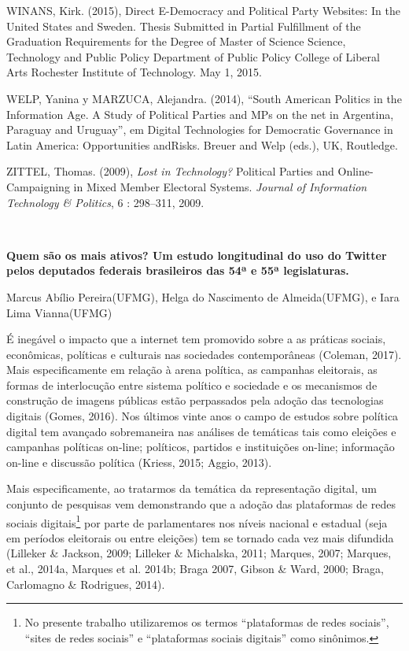 WINANS, Kirk. (2015), Direct E-Democracy and Political Party Websites:
In the United States and Sweden. Thesis Submitted in Partial Fulfillment
of the Graduation Requirements for the Degree of Master of Science
Science, Technology and Public Policy Department of Public Policy
College of Liberal Arts Rochester Institute of Technology. May 1, 2015.

WELP, Yanina y MARZUCA, Alejandra. (2014), ``South American Politics in
the Information Age. A Study of Political Parties and MPs on the net in
Argentina, Paraguay and Uruguay'', em Digital Technologies for
Democratic Governance in Latin America: Opportunities andRisks. Breuer
and Welp (eds.), UK, Routledge.

ZITTEL, Thomas. (2009), \emph{Lost in Technology?} Political Parties and
Online-Campaigning in Mixed Member Electoral Systems. \emph{Journal of
Information Technology \& Politics}, 6 : 298--311, 2009.

\textbf{\\
}

\textbf{Quem são os mais ativos? Um estudo longitudinal do uso do
Twitter pelos deputados federais brasileiros das 54ª e 55ª legislaturas.
}

Marcus Abílio Pereira(UFMG), Helga do Nascimento de Almeida(UFMG), e
Iara Lima Vianna(UFMG)

É inegável o impacto que a internet tem promovido sobre a as práticas
sociais, econômicas, políticas e culturais nas sociedades contemporâneas
(Coleman, 2017). Mais especificamente em relação à arena política, as
campanhas eleitorais, as formas de interlocução entre sistema político e
sociedade e os mecanismos de construção de imagens públicas estão
perpassados pela adoção das tecnologias digitais (Gomes, 2016). Nos
últimos vinte anos o campo de estudos sobre política digital tem
avançado sobremaneira nas análises de temáticas tais como eleições e
campanhas políticas on-line; políticos, partidos e instituições on-line;
informação on-line e discussão política (Kriess, 2015; Aggio, 2013).

Mais especificamente, ao tratarmos da temática da representação digital,
um conjunto de pesquisas vem demonstrando que a adoção das plataformas
de redes sociais digitais\footnote{No presente trabalho utilizaremos os
  termos ``plataformas de redes sociais'', ``sites de redes sociais'' e
  ``plataformas sociais digitais'' como sinônimos.} por parte de
parlamentares nos níveis nacional e estadual (seja em períodos
eleitorais ou entre eleições) tem se tornado cada vez mais difundida
(Lilleker \& Jackson, 2009; Lilleker \& Michalska, 2011; Marques, 2007;
Marques, et al., 2014a, Marques et al. 2014b; Braga 2007, Gibson \&
Ward, 2000; Braga, Carlomagno \& Rodrigues, 2014).

